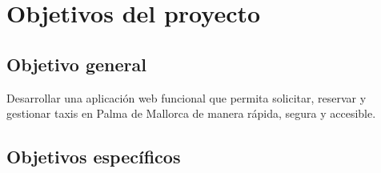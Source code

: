 \documentclass[12pt,a4paper]{article}
\begin{document}
\newpage

\section{Objetivos del proyecto}

\subsection{Objetivo general}

Desarrollar una aplicación web funcional que permita solicitar, reservar y gestionar taxis en Palma de Mallorca de manera rápida, segura y accesible.

\subsection{Objetivos específicos}
\end{document}
